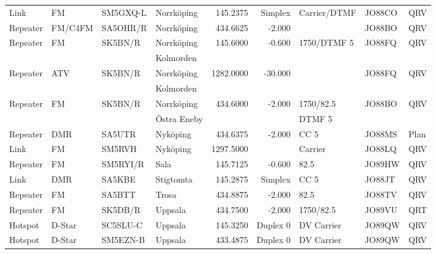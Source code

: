 \begin{longtable}{llllrrlll}
Link     & FM         & SM5GXQ-L & Norrköping        & 145.2375     & Simplex    & Carrier/DTMF    & JO88CO      & QRV      \\
Repeater & FM/C4FM    & SA5OHR/R & Norrköping        & 434.6625     & -2.000     &                 & JO88BO      & QRV      \\
Repeater & FM         & SK5BN/R  & Norrköping        & 145.6000     & -0.600     & 1750/DTMF 5     & JO88FQ      & QRV      \\
         &            &          & Kolmorden         &              &            &                 &             &          \\
Repeater & ATV        & SK5BN/R  & Norrköping        & 1282.0000    & -30.000    &                 & JO88FQ      & QRV      \\
         &            &          & Kolmorden         &              &            &                 &             &          \\
Repeater & FM         & SK5BN/R  & Norrköping        & 434.6000     & -2.000     & 1750/82.5       & JO88BO      & QRV      \\
         &            &          & Östra Eneby       &              &            & DTMF 5          &             &          \\
Repeater & DMR        & SA5UTR   & Nyköping          & 434.6375     & -2.000     & CC 5            & JO88MS      & Plan     \\
Link     & FM         & SM5RVH   & Nyköping          & 1297.5000    &            & Carrier         & JO88LQ      & QRV      \\
Repeater & FM         & SM5RYI/R & Sala              & 145.7125     & -0.600     & 82.5            & JO89HW      & QRV      \\
Link     & DMR        & SA5KBE   & Stigtomta         & 145.2875     & Simplex    & CC 5            & JO88JT      & QRV      \\
Repeater & FM         & SA5BTT   & Trosa             & 434.8875     & -2.000     & 82.5            & JO88TV      & QRV      \\
Repeater & FM         & SK5DB/R  & Uppsala           & 434.7500     & -2.000     & 1750/82.5       & JO89VU      & QRT      \\
Hotspot  & D-Star     & SC5SLU-C & Uppsala           & 145.3250     & Duplex 0   & DV Carrier      & JO89QW      & QRV      \\
Hotspot  & D-Star     & SM5EZN-B & Uppsala           & 433.4875     & Duplex 0   & DV Carrier      & JO89QW      & QRV      \\

\end{longtable}
